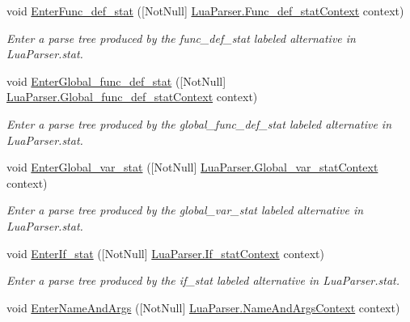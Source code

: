 \begin{DoxyCompactItemize}
void \mbox{\hyperlink{classzlua_1_1_compiler_a2a2bdb04e6e4f416e0f6141c26981c3f}{Enter\+Func\+\_\+def\+\_\+stat}} (\mbox{[}Not\+Null\mbox{]} \mbox{\hyperlink{classzlua_1_1_lua_parser_1_1_func__def__stat_context}{Lua\+Parser.\+Func\+\_\+def\+\_\+stat\+Context}} context)
\begin{DoxyCompactList}\small\item\em Enter a parse tree produced by the {\ttfamily func\+\_\+def\+\_\+stat} labeled alternative in Lua\+Parser.\+stat. \end{DoxyCompactList}\item 
void \mbox{\hyperlink{classzlua_1_1_compiler_a895f16e966c211610d41e577ea359ed4}{Enter\+Global\+\_\+func\+\_\+def\+\_\+stat}} (\mbox{[}Not\+Null\mbox{]} \mbox{\hyperlink{classzlua_1_1_lua_parser_1_1_global__func__def__stat_context}{Lua\+Parser.\+Global\+\_\+func\+\_\+def\+\_\+stat\+Context}} context)
\begin{DoxyCompactList}\small\item\em Enter a parse tree produced by the {\ttfamily global\+\_\+func\+\_\+def\+\_\+stat} labeled alternative in Lua\+Parser.\+stat. \end{DoxyCompactList}\item 
void \mbox{\hyperlink{classzlua_1_1_compiler_a303b1c4d7a6cafe7c22c4ae4cdb2d296}{Enter\+Global\+\_\+var\+\_\+stat}} (\mbox{[}Not\+Null\mbox{]} \mbox{\hyperlink{classzlua_1_1_lua_parser_1_1_global__var__stat_context}{Lua\+Parser.\+Global\+\_\+var\+\_\+stat\+Context}} context)
\begin{DoxyCompactList}\small\item\em Enter a parse tree produced by the {\ttfamily global\+\_\+var\+\_\+stat} labeled alternative in Lua\+Parser.\+stat. \end{DoxyCompactList}\item 
void \mbox{\hyperlink{classzlua_1_1_compiler_af6ae77f24cf841b02733f92d10c21074}{Enter\+If\+\_\+stat}} (\mbox{[}Not\+Null\mbox{]} \mbox{\hyperlink{classzlua_1_1_lua_parser_1_1_if__stat_context}{Lua\+Parser.\+If\+\_\+stat\+Context}} context)
\begin{DoxyCompactList}\small\item\em Enter a parse tree produced by the {\ttfamily if\+\_\+stat} labeled alternative in Lua\+Parser.\+stat. \end{DoxyCompactList}\item 
void \mbox{\hyperlink{classzlua_1_1_compiler_a84d43624eeeff6bf6b9f229a8880fe0a}{Enter\+Name\+And\+Args}} (\mbox{[}Not\+Null\mbox{]} \mbox{\hyperlink{classzlua_1_1_lua_parser_1_1_name_and_args_context}{Lua\+Parser.\+Name\+And\+Args\+Context}} context)

\end{DoxyCompactItemize}
